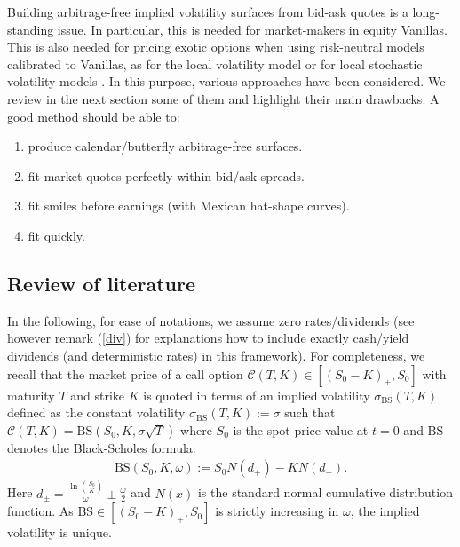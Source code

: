 \documentclass{amsart}%
\def\no{\noindent}
\theoremstyle{definition}
\theoremstyle{remark}
\newcommand{\beaa}{\begin{eqnarray*}}
\newcommand{\eeaa}{\end{eqnarray*}}
\newcommand{\cal}{\mathcal}
\begin{document}
\no Building arbitrage-free  implied volatility surfaces from bid-ask quotes is a long-standing  issue. In particular, this is needed for market-makers in equity Vanillas. This is also needed for pricing exotic options when using risk-neutral models calibrated to Vanillas, as for the local volatility model \cite{dupire1997pricing} or for local stochastic volatility models \cite{lipton2002masterclass}. In this purpose, various approaches have been  considered. We review in the next section some of them and highlight their main drawbacks. A good method should be able to:
\begin{enumerate}
\item produce calendar/butterfly arbitrage-free surfaces.
\item fit market quotes perfectly within  bid/ask spreads.
\item fit smiles before earnings (with Mexican hat-shape curves).
\item fit quickly.
\end{enumerate}

\subsection{Review of literature}
\no In the following, for ease of notations, we assume  zero rates/dividends (see however remark (\ref{div}) for explanations how to include exactly  cash/yield dividends (and deterministic rates) in this framework). For completeness, we recall that the market price of a call option ${\cal C}(T,K) \in [(S_0-K)_+, S_0]$ with maturity $T$ and strike $K$ is quoted in terms of an implied volatility $\sigma_\mathrm{BS}(T,K)$ defined as the constant volatility $\sigma_\mathrm{BS}(T,K):=\sigma$ such that ${\cal C}(T,K)=\mathrm{BS}(S_0,K,\sigma \sqrt{T})$ where $S_0$ is the spot price value at $t=0$ and $\mathrm{BS}$ denotes the Black-Scholes formula:
\beaa \mathrm{BS}(S_0,K,\omega):=S_0 N(d_+)-K N(d_-). \eeaa 
Here $ d_\pm=\frac{\ln\left(\frac{ S_0}{K}\right)}{ \omega}\pm \frac{\omega}{2} $ and $N(x)$ is the standard normal cumulative distribution function.  As $\mathrm{BS} \in [(S_0-K)_+, S_0]$ is strictly increasing in $\omega$, the implied volatility is unique.
\end{document}
